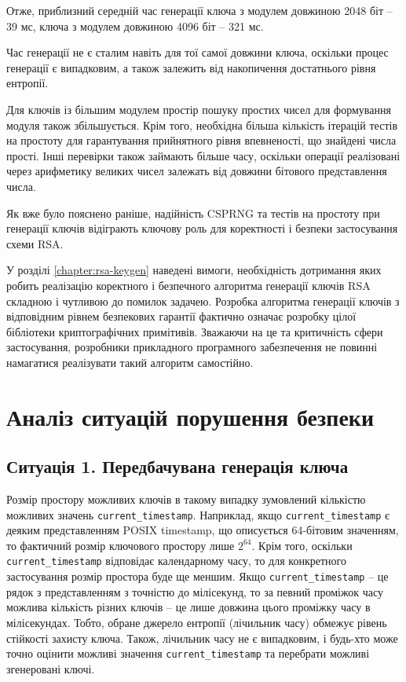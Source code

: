 \documentclass{kpi-lab}
\begin{document}
Отже, приблизний середній час генерації ключа з модулем довжиною
2048 біт -- 39 мс,
ключа з модулем довжиною 4096 біт -- 321 мс.

Час генерації не є сталим навіть для тої самої довжини ключа, оскільки
процес генерації є випадковим, а також залежить від
накопичення достатнього рівня ентропії.

Для ключів із більшим модулем простір пошуку простих чисел
для формування модуля також збільшується. Крім того,
необхідна більша кількість ітерацій тестів на простоту для
гарантування прийнятного рівня впевненості, що знайдені числа прості.
Інші перевірки також займають більше часу, оскільки
операції реалізовані через арифметику великих чисел
залежать від довжини бітового представлення числа.

Як вже було пояснено раніше, надійність CSPRNG та
тестів на простоту при генерації ключів відіграють ключову
роль для коректності і безпеки застосування схеми RSA.

У розділі \ref{chapter:rsa-keygen} наведені вимоги,
необхідність дотримання яких робить реалізацію коректного і безпечного
алгоритма генерації ключів RSA складною і чутливою до помилок задачею.
Розробка алгоритма генерації ключів з відповідним рівнем
безпекових гарантії
фактично означає розробку цілої бібліотеки криптографічних примітивів.
Зважаючи на це та критичність сфери застосування,
розробники прикладного програмного забезпечення не повинні
намагатися реалізувати такий алгоритм самостійно.

\chapter{Аналіз ситуацій порушення безпеки}

\section{
  \textbf{Ситуація 1.} Передбачувана генерація ключа
}

Розмір простору можливих ключів  в такому випадку зумовлений
кількістю можливих значень \texttt{current\_timestamp}.
Наприклад, якщо \texttt{current\_timestamp} є деяким
представленням POSIX timestamp, що описується 64-бітовим
значенням, то фактичний розмір ключового простору лише \(2^64\).
Крім того, оскільки \texttt{current\_timestamp} відповідає
календарному часу,
то для конкретного застосування розмір простора буде ще меншим.
Якщо \texttt{current\_timestamp} -- це рядок з
представленням з точністю до мілісекунд,
то за певний проміжок часу можлива кількість різних ключів
-- це лише довжина цього проміжку часу в мілісекундах.
Тобто, обране джерело ентропії (лічильник часу) обмежує
рівень стійкості захисту ключа.
Також, лічильник часу не є випадковим, і будь-хто може
точно оцінити можливі значення
\texttt{current\_timestamp} та перебрати можливі згенеровані ключі.
\end{document}
